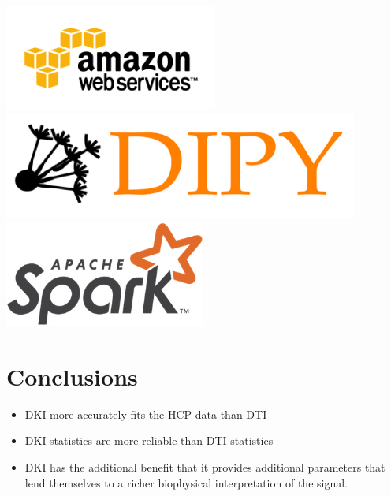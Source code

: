 \documentclass[a0, landscape]{a0poster}
\begin{document}
\begin{multicols}{3}
\hspace{2 mm}
\includegraphics[height=3.5cm]{AWS.png}
\hspace{2 mm}
\includegraphics[height=3.5cm]{dipy-logo.png}
\hspace{2 mm}
\includegraphics[height=3.5cm]{spark-logo.png}
\hspace{2 mm}



\color{SaddleBrown} %

\section*{Conclusions}
\large
\begin{itemize}

\item DKI more accurately fits the HCP data than DTI

\item DKI statistics are more reliable than DTI statistics

\item DKI has the additional benefit that it provides additional parameters that
lend themselves to a richer biophysical interpretation of the signal.

\end{itemize}


\end{multicols}
\end{document}
